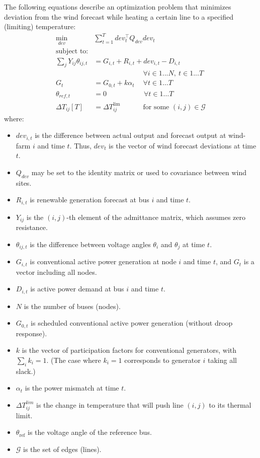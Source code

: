 \documentclass[conference]{IEEEtran}
\begin{document}
The following equations describe an optimization problem that
minimizes deviation from the wind forecast while heating a certain
line to a specified (limiting) temperature:
\begin{subequations}\label{I:all}
\begin{align}
\label{I:obj}\underset{dev}{\min} \quad & \sum_{t=1}^{T} dev_t^\top Q_{dev} dev_t \\
\nonumber \text{subject to:} & \\
\label{I:flow} \sum_j Y_{ij} \theta_{ij,t} & = G_{i,t} + R_{i,t} +
dev_{i,t} - D_{i,t} \\[-8pt]
\nonumber &\qquad\qquad\qquad\quad \forall i \in 1... N,~t\in 1... T \\%
\label{I:conv} G_t &= G_{0,t} + k\alpha_t \quad\: \forall t\in 1\ldots T \\
\label{I:slack} \theta_{ref,t} & = 0 \qquad\qquad\quad\; \forall t\in 1\ldots T \\
\label{I:lim} \Delta T_{ij}[T] &= \Delta T_{ij}^\text{lim}\qquad\quad\: \text{for some }(i,j)\in \mathcal{G}
\end{align}
\end{subequations}
where:
\begin{itemize}
\itemsep1pt\parskip0pt
\item $dev_{i,t}$ is the difference between actual output and forecast output at wind-farm $i$ and time $t$. Thus, $dev_t$ is the vector of wind forecast deviations at time $t$.
\item $Q_{dev}$ may be set to the identity matrix or used to covariance between wind sites.
\item $R_{i,t}$ is renewable generation forecast at bus $i$ and time $t$.
\item $Y_{ij}$ is the $(i,j)$-th element of the admittance matrix, which assumes zero resistance.
\item $\theta_{ij,t}$ is the difference between voltage angles $\theta_i$ and $\theta_j$ at time $t$.
\item $G_{i,t}$ is conventional active power generation at node $i$ and time $t$, and $G_t$ is a vector including all nodes.
\item $D_{i,t}$ is active power demand at bus $i$ and time $t$.
\item $N$ is the number of buses (nodes).
\item $G_{0,t}$ is scheduled conventional active power generation (without droop response).
\item $k$ is the vector of participation factors for conventional generators, with $\sum_i k_i = 1$. (The case where $k_i=1$ corresponds to generator $i$ taking all slack.)
\item $\alpha_t$ is the power mismatch at time $t$.
\item $\Delta T_{ij}^{lim}$ is the change in temperature that will push line $(i,j)$ to its thermal limit.
\item $\theta_\text{ref}$ is the voltage angle of the reference bus.
\item $\mathcal{G}$ is the set of edges (lines).
\end{itemize}
\end{document}
